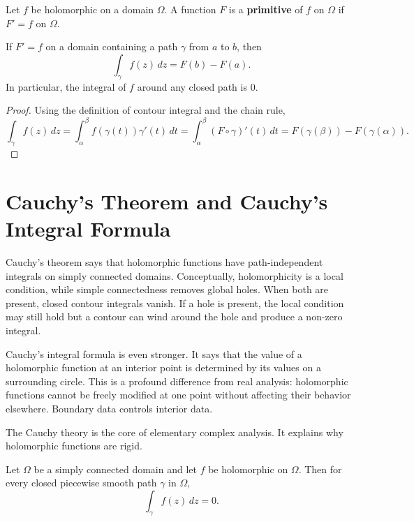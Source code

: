 \begin{definition}[Primitive]
Let $f$ be holomorphic on a domain $\Omega$. A function $F$ is a \textbf{primitive} of $f$ on $\Omega$ if $F'=f$ on $\Omega$.
\end{definition}

\begin{theorem}
If $F'=f$ on a domain containing a path $\gamma$ from $a$ to $b$, then
\[
    \int_\gamma f(z)\,dz=F(b)-F(a).
\]
In particular, the integral of $f$ around any closed path is $0$.
\end{theorem}

\begin{proof}
Using the definition of contour integral and the chain rule,
\[
    \int_\gamma f(z)\,dz=\int_\alpha^\beta f(\gamma(t))\gamma'(t)\,dt
    =\int_\alpha^\beta (F\circ\gamma)'(t)\,dt=F(\gamma(\beta))-F(\gamma(\alpha)).
\]
\end{proof}

\section{Cauchy's Theorem and Cauchy's Integral Formula}


Cauchy's theorem says that holomorphic functions have path-independent integrals on simply connected domains. Conceptually, holomorphicity is a local condition, while simple connectedness removes global holes. When both are present, closed contour integrals vanish. If a hole is present, the local condition may still hold but a contour can wind around the hole and produce a non-zero integral.

Cauchy's integral formula is even stronger. It says that the value of a holomorphic function at an interior point is determined by its values on a surrounding circle. This is a profound difference from real analysis: holomorphic functions cannot be freely modified at one point without affecting their behavior elsewhere. Boundary data controls interior data.

The Cauchy theory is the core of elementary complex analysis. It explains why holomorphic functions are rigid.

\begin{theorem}
Let $\Omega$ be a simply connected domain and let $f$ be holomorphic on $\Omega$. Then for every closed piecewise smooth path $\gamma$ in $\Omega$,
\[
    \int_\gamma f(z)\,dz=0.
\]
\end{theorem}

